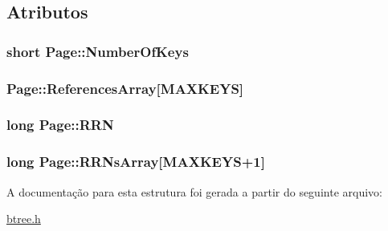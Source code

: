 \subsection{Atributos}
\hypertarget{structPage_acdf847d542fe044c708988c73c085a12}{
\subsubsection[{Number\-Of\-Keys}]{\setlength{\rightskip}{0pt plus 5cm}short Page\-::\-Number\-Of\-Keys}}\label{structPage_acdf847d542fe044c708988c73c085a12}
\hypertarget{structPage_aaebbe744e681558d4c4f88644e749c69}{
\subsubsection[{References\-Array}]{ Page\-::\-References\-Array\mbox{[}{\bf M\-A\-X\-K\-E\-Y\-S}\mbox{]}}}\label{structPage_aaebbe744e681558d4c4f88644e749c69}
\hypertarget{structPage_a51a247adb6f674ece5503f277df96569}{
\subsubsection[{R\-R\-N}]{\setlength{\rightskip}{0pt plus 5cm}long Page\-::\-R\-R\-N}}\label{structPage_a51a247adb6f674ece5503f277df96569}
\hypertarget{structPage_ae69cef3a164fdc413fa54498f181974f}{
\subsubsection[{R\-R\-Ns\-Array}]{\setlength{\rightskip}{0pt plus 5cm}long Page\-::\-R\-R\-Ns\-Array\mbox{[}{\bf M\-A\-X\-K\-E\-Y\-S}+1\mbox{]}}}\label{structPage_ae69cef3a164fdc413fa54498f181974f}


A documentação para esta estrutura foi gerada a partir do seguinte arquivo\-:\begin{DoxyCompactItemize}
\item 
\hyperlink{btree_8h}{btree.\-h}\end{DoxyCompactItemize}

